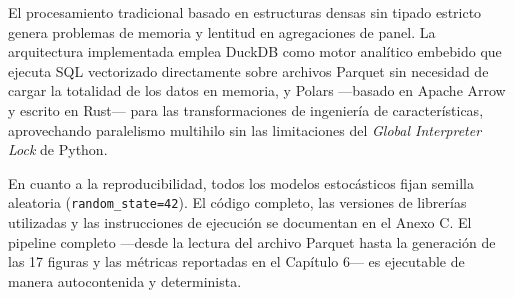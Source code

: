 El procesamiento tradicional basado en estructuras densas sin tipado estricto genera problemas de memoria y lentitud en agregaciones de panel. La arquitectura implementada emplea DuckDB como motor analítico embebido que ejecuta SQL vectorizado directamente sobre archivos Parquet sin necesidad de cargar la totalidad de los datos en memoria, y Polars —basado en Apache Arrow y escrito en Rust— para las transformaciones de ingeniería de características, aprovechando paralelismo multihilo sin las limitaciones del \textit{Global Interpreter Lock} de Python.

En cuanto a la reproducibilidad, todos los modelos estocásticos fijan semilla aleatoria (\texttt{random\_state=42}). El código completo, las versiones de librerías utilizadas y las instrucciones de ejecución se documentan en el Anexo C. El pipeline completo —desde la lectura del archivo Parquet hasta la generación de las 17 figuras y las métricas reportadas en el Capítulo 6— es ejecutable de manera autocontenida y determinista.

